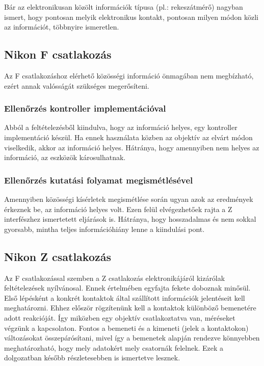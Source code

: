 Bár az elektronikusan közölt információk típusa (pl.: rekeszátmérő) nagyban ismert, hogy pontosan melyik elektronikus kontakt, pontosan milyen módon közli az információt, többnyire ismeretlen.
\subsection{Nikon F csatlakozás}
Az F csatlakozáshoz elérhető közösségi információ önmagában nem megbízható, ezért annak valósságát szükséges megerősíteni.
\subsubsection{Ellenőrzés kontroller implementációval}
Abból a feltételezésből kiindulva, hogy az információ helyes, egy kontroller implementáció készül.
Ha ennek használata közben az objektív az elvárt módon viselkedik, akkor az információ helyes.
Hátránya, hogy amennyiben nem helyes az információ, az eszközök károsulhatnak.
\subsubsection{Ellenőrzés kutatási folyamat megismétlésével}
Amennyiben közösségi kísérletek megismétlése során ugyan azok az eredmények érkeznek be, az információ helyes volt.
Ezen felül elvégezhetőek rajta a Z interfészhez ismertetett eljárások is.
Hátránya, hogy hosszadalmas és nem sokkal gyorsabb, mintha teljes információhiány lenne a kiindulási pont.

\subsection{Nikon Z csatlakozás}
Az F csatlakozással szemben a Z csatlakozás elektronikájáról kizárólak feltételezések nyílvánosal.
Ennek értelmében egyfajta fekete doboznak minősül.
\label{z_elemzes}
Első lépésként a konkrét kontaktok által szállított információk jelentéseit kell meghatározni.
Ehhez először rögzítenünk kell a kontaktok különböző bemenetére adott reakcióját.
Így miközben egy objektív csatlakoztatva van, méréseket végzünk a kapcsolaton.
Fontos a bemeneti és a kimeneti (jelek a kontaktokon) változásokat összepárósítani, mivel így a bemenetek alapján rendezve könnyebben meghatározható, hogy mely adatokért mely csatornák felelnek.
Ezek a dolgozatban később részletesebben is ismertetve lesznek.
